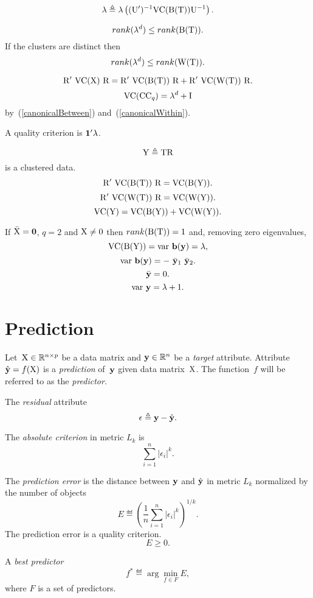 \documentclass[10pt,a4paper]{article}
\theoremstyle{plain} \newtheorem{Lem}{Lemma}
\begin{document}
$$ \mathbf \lambda \triangleq \mathbf \lambda \left((\mathrm U')^{-1} \mathrm {VC}(\mathrm B(\mathrm T)) \mathrm U^{-1} \right). $$

$$ rank (\mathbf \lambda^d) \le rank(\mathrm B(\mathrm T)). $$
If the clusters are distinct then
$$ rank (\mathbf \lambda^d) \le rank(\mathrm W(\mathrm T)). $$

$$ \mathrm R' \ \mathrm {VC}(\mathrm X) \ \mathrm R = \mathrm R' \ \mathrm {VC}(\mathrm B(\mathrm T)) \ \mathrm R + \mathrm R' \ \mathrm {VC}(\mathrm W(\mathrm T)) \ \mathrm R. $$
$$ \mathrm {VC} (\mathrm {CC}_q) = \mathbf \lambda^d + \mathrm I $$
by~(\ref{canonicalBetween}) and~(\ref{canonicalWithin}).

A quality criterion is $\mathbf 1' \mathbf \lambda$.

\bigskip
$$ \mathrm Y \triangleq \mathrm T \mathrm R $$
is a clustered data.
$$ \mathrm R' \ \mathrm {VC}(\mathrm B(\mathrm T)) \ \mathrm R = \mathrm {VC}(\mathrm B(\mathrm Y)). $$
$$ \mathrm R' \ \mathrm {VC}(\mathrm W(\mathrm T)) \ \mathrm R = \mathrm {VC}(\mathrm W(\mathrm Y)). $$
$$ \mathrm {VC}(\mathrm Y) = \mathrm {VC}(\mathrm B(\mathrm Y)) + \mathrm {VC}(\mathrm W(\mathrm Y)). $$

\bigskip
If $\bar {\mathrm X} = \mathbf 0$, $q = 2$ and $\mathrm X \ne \mathrm 0$
then $rank (\mathrm B(\mathrm T)) = 1$
and, removing zero eigenvalues,
$$\mathrm {VC}(\mathrm B(\mathrm Y)) = \mathrm {var} \  \mathbf b(\mathbf y) = \lambda, $$
$$ \mathrm {var} \  \mathbf b(\mathbf y) = - \ {\bar {\mathbf y}}_1 \ {\bar {\mathbf y}}_2. $$
$$ \bar {\mathbf y} = 0. $$
$$ \mathrm {var} \  \mathbf y = \lambda + 1. $$



\section{Prediction}
Let~$\mathrm X \in \mathbb R^{n \times p}$ be a data matrix and $\mathbf y \in \mathbb R^n$ be a {\em target} attribute.
Attribute~$\hat {\mathbf y}=f(\mathrm X)$ is a {\em prediction} of~$\mathbf y$ given data matrix~$\mathrm X$.
The function~$f$ will be referred to as the {\em predictor}.

The {\em residual} attribute
$$ \mathbf \epsilon \triangleq \mathbf y - \hat {\mathbf y}. $$

The {\em absolute criterion} in metric $L_k$ is
$$ \sum_{i=1}^n |\epsilon_i|^k. $$

The {\em prediction error} is the distance between $\mathbf y$ and $\hat {\mathbf y}$ in metric $L_k$ normalized by the number of objects
$$ E \eqdef \left(\frac 1 n \sum_{i=1}^n |\epsilon_i|^k \right)^{1/k}. $$
The prediction error is a quality criterion.
$$ E \ge 0. $$

A {\em best predictor}
\begin{equation} \label{bestPredictor}
f^* \eqdef \arg \min_{f \in F} E,
\end{equation}
where $F$ is a set of predictors.
\end{document}
